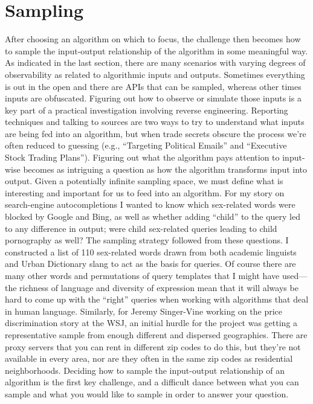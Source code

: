 \section{Sampling }
After choosing an algorithm on which to focus, the challenge then becomes how to sample the input-output relationship of the algorithm in some meaningful way. As indicated in the last section, there are many scenarios with varying degrees of observability as related to algorithmic inputs and outputs. Sometimes everything is out in the open and there are APIs that can be sampled, whereas other times inputs are obfuscated. Figuring out how to observe or simulate those inputs is a key part of a practical investigation involving reverse engineering. Reporting techniques and talking to sources are two ways to try to understand what inputs are being fed into an algorithm, but when trade secrets obscure the process we're often reduced to guessing (e.g., ``Targeting Political Emails'' and ``Executive Stock Trading Plans''). Figuring out what the algorithm pays attention to input-wise becomes as intriguing a question as how the algorithm transforms input into output. 
Given a potentially infinite sampling space, we must define what is interesting and important for us to feed into an algorithm. For my story on search-engine autocompletions I wanted to know which sex-related words were blocked by Google and Bing, as well as whether adding ``child'' to the query led to any difference in output; were child sex-related queries leading to child pornography as well? The sampling strategy followed from these questions. I constructed a list of 110 sex-related words drawn from both academic linguists and Urban Dictionary slang to act as the basis for queries. Of course there are many other words and permutations of query templates that I might have used—the richness of language and diversity of expression mean that it will always be hard to come up with the ``right'' queries when working with algorithms that deal in human language. 
Similarly, for Jeremy Singer-Vine working on the price discrimination story at the WSJ, an initial hurdle for the project was getting a representative sample from enough different and dispersed geographies. There are proxy servers that you can rent in different zip codes to do this, but they're not available in every area, nor are they often in the same zip codes as residential neighborhoods. Deciding how to sample the input-output relationship of an algorithm is the first key challenge, and a difficult dance between what you can sample and what you would like to sample in order to answer your question. 
